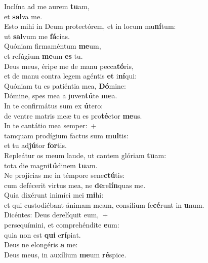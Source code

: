 \evenverse Inclína ad me aurem \textbf{tu}am,~\*\\
\evenverse et \textbf{sal}va me.\\
\oddverse Esto mihi in Deum protectórem, et in locum mu\textbf{ní}tum:~\*\\
\oddverse ut \textbf{sal}vum me \textbf{fá}cias.\\
\evenverse Quóniam firmaméntum \textbf{me}um,~\*\\
\evenverse et refúgium \textbf{me}um \textbf{es} tu.\\
\oddverse Deus meus, éripe me de manu pecca\textbf{tó}ris,~\*\\
\oddverse et de manu contra legem agéntis \textbf{et} i\textbf{ní}qui:\\
\evenverse Quóniam tu es patiéntia mea, \textbf{Dó}mine:~\*\\
\evenverse Dómine, spes mea a juven\textbf{tú}te \textbf{me}a.\\
\oddverse In te confirmátus sum ex \textbf{ú}tero:~\*\\
\oddverse de ventre matris meæ tu es pro\textbf{té}ctor \textbf{me}us.\\
\evenverse In te cantátio mea semper:~+\\
\evenverse  tamquam prodígium factus sum \textbf{mul}tis:~\*\\
\evenverse et tu ad\textbf{jú}tor \textbf{for}tis.\\
\oddverse Repleátur os meum laude, ut cantem glóriam \textbf{tu}am:~\*\\
\oddverse tota die magni\textbf{tú}dinem \textbf{tu}am.\\
\evenverse Ne projícias me in témpore sene\textbf{ctú}tis:~\*\\
\evenverse cum defécerit virtus mea, ne \textbf{de}re\textbf{lín}quas me.\\
\oddverse Quia dixérunt inimíci mei \textbf{mi}hi:~\*\\
\oddverse et qui custodiébant ánimam meam, consílium fe\textbf{cé}runt in \textbf{u}num.\\
\evenverse Dicéntes: Deus derelíquit eum,~+\\
\evenverse  persequímini, et comprehéndite \textbf{e}um:~\*\\
\evenverse quia non est \textbf{qui} e\textbf{rí}piat.\\
\oddverse Deus ne elongéris \textbf{a} me:~\*\\
\oddverse Deus meus, in auxílium \textbf{me}um \textbf{ré}spice.\\
